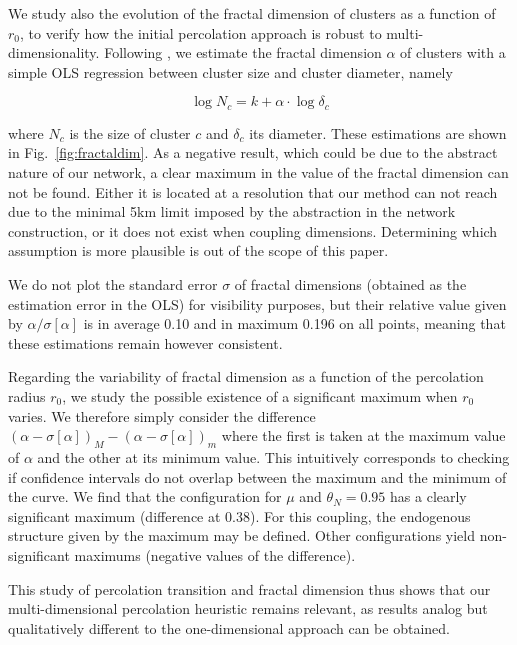 \documentclass{jimis-en}
\begin{document}
We study also the evolution of the fractal dimension of clusters as a function of $r_0$, to verify how the initial percolation approach is robust to multi-dimensionality. Following \cite{arcaute2016cities}, we estimate the fractal dimension $\alpha$ of clusters with a simple OLS regression between cluster size and cluster diameter, namely 

\begin{equation}
\log N_c = k + \alpha \cdot \log \delta_c
\end{equation}

where $N_c$ is the size of cluster $c$ and $\delta_c$ its diameter. These estimations are shown in Fig.~\ref{fig:fractaldim}. As a negative result, which could be due to the abstract nature of our network, a clear maximum in the value of the fractal dimension can not be found. Either it is located at a resolution that our method can not reach due to the minimal 5km limit imposed by the abstraction in the network construction, or it does not exist when coupling dimensions. Determining which assumption is more plausible is out of the scope of this paper.

We do not plot the standard error $\sigma$ of fractal dimensions (obtained as the estimation error in the OLS) for visibility purposes, but their relative value given by $\alpha / \sigma\left[\alpha\right]$ is in average 0.10 and in maximum 0.196 on all points, meaning that these estimations remain however consistent.

Regarding the variability of fractal dimension as a function of the percolation radius $r_0$, we study the possible existence of a significant maximum when $r_0$ varies. We therefore simply consider the difference $(\alpha - \sigma\left[\alpha\right])_M - (\alpha - \sigma\left[\alpha\right])_m$ where the first is taken at the maximum value of $\alpha$ and the other at its minimum value. This intuitively corresponds to checking if confidence intervals do not overlap between the maximum and the minimum of the curve. We find that the configuration for $\mu$ and $\theta_N=0.95$ has a clearly significant maximum (difference at 0.38). For this coupling, the endogenous structure given by the maximum may be defined. Other configurations yield non-significant maximums (negative values of the difference).


This study of percolation transition and fractal dimension thus shows that our multi-dimensional percolation heuristic remains relevant, as results analog but qualitatively different to the one-dimensional approach can be obtained.
\end{document}
